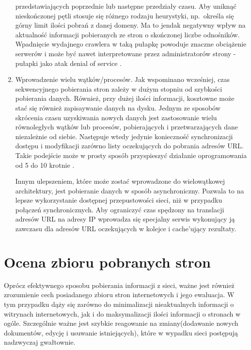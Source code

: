 \begin{enumerate}
          przedstawiających poprzednie lub następne przedziały czasu. Aby uniknąć nieskończonej pętli stosuje się różnego rodzaju heurystyki,
          np.~określa się górny limit ilości pobrań z danej domeny. Ma to jendak negatywny wpływ na aktualność informacji pobieranych ze stron
          o skończonej liczbe odnośników. Wpadnięcie wydajnego crawlera w taką pułapkę powoduje znaczne obciążenie serwerów i może być nawet interpretowane
          przez administratorów strony - pułapki jako atak denial of service \cite[s. 322]{webMining}.
    \item Wprowadzenie wielu wątków/procesów. Jak wspominano wcześniej, czas sekwencyjnego pobierania stron zależy w dużym stopniu od szybkości pobierania
          danych. Również, przy dużej ilości informacji, kosztowne może stać się również zapisaywanie danych na dysku. Jednym ze sposobów skrócenia
          czasu uzyskiwania nowych danych jest zastosowanie wielu równoległych wątków lub procesów, pobierających i przetwarzających dane niezależnie
          od siebie. Następuje wtedy jedynie konieczność synchronizacji dostępu i modyfikacji zarówno listy oczekujących do pobrania adresów URL. Takie
          podejście może w prosty sposób przyspieszyć działanie oprogramowania od 5 do 10 krotnie \cite[s. 323]{webMining}.
          
          Innym ulepszeniem, które może zostać wprowadzone do wielowątkowej architektury, jest pobieranie danych w sposób asynchroniczny. Pozwala to na 
          lepsze wykorzystanie dostępnej przepustowości sieci, niż w przypadku połączeń synchronicznych. Aby ograniczyć czas spędzony na translacji adresów
          URL na adresy IP wprowadza się specjalny serwis wykonujący ją zawczasu dla adresów URL oczekujących w kolejce i cache'ujący rezultaty.
          
\end{enumerate}


\section{Ocena zbioru pobranych stron}
\label{sec:ocenaStron}

Oprócz efektywnego sposobu pobierania informacji z sieci, ważne jest również zrozumienie cech posiadanego zbioru stron internetowych i jego ewaluacja.
W tym przypadku dąży się zarówno do minimalizacji nieaktualnych informacji o witrynach internetowych, jak i do maksymalizacji ilości informacji o stronach
w ogóle. Szczególnie ważne jest szybkie reagowanie na zmiany(dodawanie nowych dokumentów, edycję i usuwanie istniejących), które w wypadku sieci postępują
nadzwyczaj gwałtownie.

